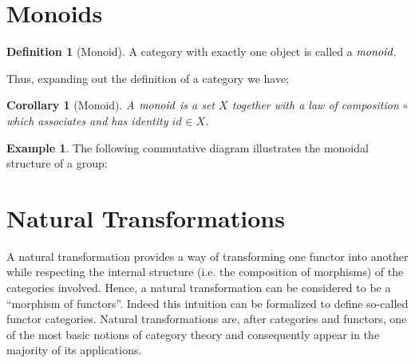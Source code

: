 \documentclass[10pt, oneside, reqno]{amsart}
\theoremstyle{plain}%
\newtheorem*{cor}{Corollary}
\theoremstyle{definition}
\newtheorem{defn}[thm]{Definition}
\newtheorem{exmp}[thm]{Example}
\theoremstyle{remark}
\newcommand{\Id}{\mathit{id}_}
\begin{document}
\section{Monoids} %
\label{sec:monoids}

\begin{defn}[Monoid]
 A category with exactly one object is called a $\emph{monoid}$.
\end{defn}

Thus, expanding out the definition of a category we have;
\begin{cor}[Monoid]
 A $\emph{monoid}$ is a set $X$ together with a law of composition $\circ$
 which associates and has identity $\Id{} \in X$.
\end{cor}

\begin{exmp}
 The following commutative diagram illustrates the monoidal structure of a group:
 \monoid{
  (A\otimes A)\otimes A\otimes A &
  A\otimes (A\otimes A) &
  A\otimes A &
  A\otimes A &
  A &
  \mu\otimes \Id{} &
  \Id{} \otimes\mu &
  \mu &
  \mu\otimes \Id{}
 }
\end{exmp}


\section{Natural Transformations} %
\label{sec:natural transformations}
A natural transformation provides a way of transforming one functor into another
while respecting the internal structure (i.e. the composition of morphisms) of the categories involved.
Hence, a natural transformation can be considered to be a ``morphism of functors''.
Indeed this intuition can be formalized to define so-called functor categories.
Natural transformations are, after categories and functors, one of the most basic notions of category theory
and consequently appear in the majority of its applications.
\end{document}
